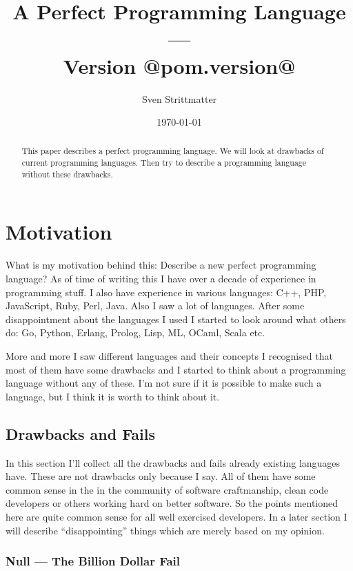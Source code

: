 \documentclass[12pt,a4paper]{report}
\title{%
    A Perfect Programming Language \\
    \large --- \\
    Version @pom.version@}
\author{Sven Strittmatter}
\date{\today}
\begin{document}
\maketitle

\begin{abstract}
This paper describes a perfect programming language. We will look at drawbacks of current programming languages. Then try to describe a programming language  without these drawbacks.
\end{abstract}

\tableofcontents

\chapter{Motivation}

What is my motivation behind this: Describe a new perfect programming language? As of time of writing this I have over a decade of experience in programming stuff. I also have experience in various languages: C++, PHP, JavaScript, Ruby, Perl, Java. Also I saw a lot of languages. After some disappointment about the languages I used I started to look around what others do: Go, Python, Erlang, Prolog, Lisp, ML, OCaml, Scala etc.

More and more I saw different languages and their concepts I recognised that most of them have some drawbacks and I started to think about a programming language without any of these. I'm not sure if it is possible to make such a language, but I think it is worth to think about it.

\section{Drawbacks and Fails}

In this section I'll collect all the drawbacks and fails already existing languages have. These are not drawbacks only because I say. All of them have some common sense in the in the community of software craftmanship, clean code developers or others working hard on better software. So the points mentioned here are quite common sense for all well exercised developers. In a later section I will describe ``disappointing'' things which are merely based on my opinion.

\subsection{Null --- The Billion Dollar Fail}
\end{document}
